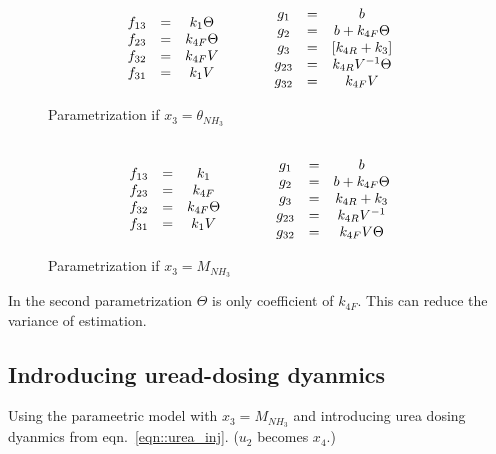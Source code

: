 \begin{figure}[H]
 \begin{align*}
    \begin{matrix} 
    \\f_{13} &=& k_1 \Theta
    \\f_{23} &=& k_{4F} \Theta
    \\f_{32} &=& k_{4F} V
    \\f_{31} &=& k_1 V
     \end{matrix}
    \qquad \qquad
    \begin{matrix} 
    \\ g_1    &=& b
    \\ g_2    &=& b + k_{4F} \Theta
    \\ g_{3}  &=& [k_{4R}+k_3]
    \\ g_{23} &=& k_{4R} V^{-1} \Theta
    \\ g_{32} &=& k_{4F} V
     \end{matrix}
\end{align*}
 \caption*{Parametrization if $x_3 = \theta_{NH_3}$}
\end{figure}
\begin{figure}[H]
\begin{align*}
    \begin{matrix} 
    \\f_{13} &=& k_1
    \\f_{23} &=& k_{4F}
    \\f_{32} &=& k_{4F} \Theta
    \\f_{31} &=& k_1 V
     \end{matrix}
    \qquad \qquad
    \begin{matrix} 
    \\ g_1    &=& b
    \\ g_2    &=& b + k_{4F} \Theta
    \\ g_{3}  &=& k_{4R}+k_3
    \\ g_{23} &=& k_{4R} V^{-1}
    \\ g_{32} &=& k_{4F} V \Theta
     \end{matrix}
\end{align*}
\caption*{Parametrization if $x_3 = M_{NH_3}$}
\end{figure}

In the second parametrization $\Theta$ is only coefficient of $k_{4F}$. This can
reduce the variance of estimation.

\subsection{Indroducing uread-dosing dyanmics}
Using the parameetric model with $x_3 = M_{NH_3}$ and introducing urea dosing
dyanmics from eqn.~\ref{eqn::urea_inj}. ($u_2$ becomes $x_4$.)

